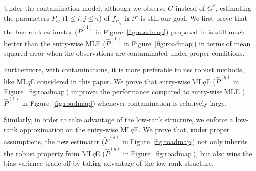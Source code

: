 \documentclass[a4paper]{article}
\renewcommand{\hat}{\widehat}
\begin{document}
Under the contamination model, although we observe $G$ instead of $G^*$, estimating the parameters $P_{ij}$ ($1 \le i, j \le n$) of $f_{P_{ij}}$ in $\mathcal{F}$ is still our goal. We first prove that the low-rank estimator ($\widetilde{P}^{(1)}$ in Figure~\ref{fig:roadmap}) proposed in \citep{tang2016law} is still much better than the entry-wise MLE ($\hat{P}^{(1)}$ in Figure~\ref{fig:roadmap}) in terms of mean squared error when the observations are contaminated under proper conditions.

Furthermore, with contaminations, it is more preferable to use robust methods, like ML$q$E \citep{ferrari2010, qin2013maximum} considered in this paper. We prove that entry-wise ML$q$E ($\hat{P}^{(q)}$ in Figure~\ref{fig:roadmap}) improves the performance compared to entry-wise MLE ($\hat{P}^{(1)}$ in Figure~\ref{fig:roadmap}) whenever contamination is relatively large.

Similarly, in order to take advantage of the low-rank structure, we enforce a low-rank approximation on the entry-wise ML$q$E. We prove that, under proper assumptions, the new estimator ($\widetilde{P}^{(q)}$ in Figure~\ref{fig:roadmap}) not only inherits the robust property from ML$q$E ($\hat{P}^{(q)}$ in Figure~\ref{fig:roadmap}), but also wins the bias-variance trade-off by taking advantage of the low-rank structure.
\end{document}
